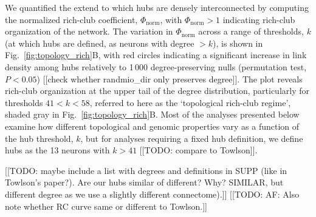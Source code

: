 \documentclass[10pt,letterpaper]{article}
\begin{document}
We quantified the extend to which hubs are densely interconnected by computing the normalized rich-club coefficient, $\Phi_\mathrm{norm}$, with $\Phi_\mathrm{norm} > 1$ indicating rich-club organization of the network.
The variation in $\Phi_\mathrm{norm}$ across a range of thresholds, $k$ (at which hubs are defined, as neurons with degree $>k$), is shown in Fig.~\ref{fig:topology_rich}B, with red circles indicating a significant increase in link density among hubs relatively to 1\,000 degree-preserving nulls (permutation test, $P < 0.05$) [[check whether randmio\_dir only preserves degree]].
The plot reveals rich-club organization at the upper tail of the degree distribution, particularly for thresholds $41 < k < 58$, referred to here as the `topological rich-club regime', shaded gray in Fig.~\ref{fig:topology_rich}B.
Most of the analyses presented below examine how different topological and genomic properties vary as a function of the hub threshold, $k$, but for analyses requiring a fixed hub definition, we define hubs as the 13 neurons with $k > 41$ [[TODO: compare to Towlson]].

[[TODO: maybe include a list with degrees and definitions in SUPP (like in Towlson's paper?). Are our hubs similar of different? Why? SIMILAR, but different degree as we use a slightly different connectome).]]
[[TODO: AF: Also note whether RC curve same or different to Towlson.]]
\end{document}
